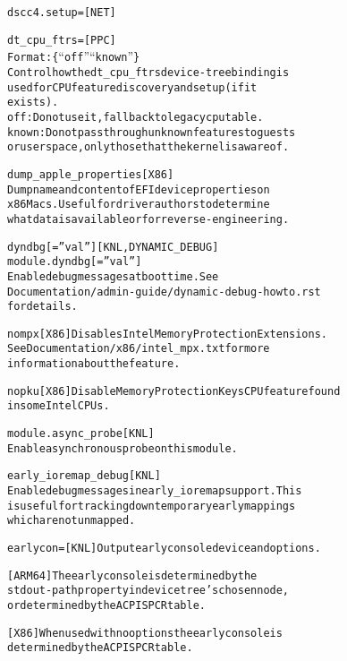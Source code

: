 \documentclass[a4paper,8pt,english]{sphinxmanual}
\begin{document}
\begin{alltt}
        dscc4.setup=    {[}NET{]}

        dt\_cpu\_ftrs=    {[}PPC{]}
                        Format: \{``off'' \textbar{} ``known''\}
                        Control how the dt\_cpu\_ftrs device-tree binding is
                        used for CPU feature discovery and setup (if it
                        exists).
                        off: Do not use it, fall back to legacy cpu table.
                        known: Do not pass through unknown features to guests
                        or userspace, only those that the kernel is aware of.

        dump\_apple\_properties   {[}X86{]}
                        Dump name and content of EFI device properties on
                        x86 Macs.  Useful for driver authors to determine
                        what data is available or for reverse-engineering.

        dyndbg{[}=''val''{]}          {[}KNL,DYNAMIC\_DEBUG{]}
        module.dyndbg{[}=''val''{]}
                        Enable debug messages at boot time.  See
                        Documentation/admin-guide/dynamic-debug-howto.rst
                        for details.

        nompx           {[}X86{]} Disables Intel Memory Protection Extensions.
                        See Documentation/x86/intel\_mpx.txt for more
                        information about the feature.

        nopku           {[}X86{]} Disable Memory Protection Keys CPU feature found
                        in some Intel CPUs.

        module.async\_probe {[}KNL{]}
                        Enable asynchronous probe on this module.

        early\_ioremap\_debug {[}KNL{]}
                        Enable debug messages in early\_ioremap support. This
                        is useful for tracking down temporary early mappings
                        which are not unmapped.

        earlycon=       {[}KNL{]} Output early console device and options.

                        {[}ARM64{]} The early console is determined by the
                        stdout-path property in device tree's chosen node,
                        or determined by the ACPI SPCR table.

                        {[}X86{]} When used with no options the early console is
                        determined by the ACPI SPCR table.


\end{alltt}
\end{document}
